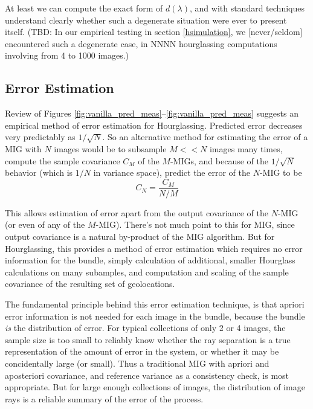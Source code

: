 \documentclass[11pt]{amsart}
\begin{document}
At least we can compute the exact form of $d(\lambda)$, and with
standard techniques understand clearly whether such a degenerate
situation were ever to present itself. (TBD: In our empirical testing
in section \ref{hsimulation}, we [never/seldom] encountered such a
degenerate case, in NNNN hourglassing computations involving from 4 to
1000 images.)


\subsection{Error Estimation}
Review of Figures \ref{fig:vanilla_pred_meas}--\ref{fig:vanilla_pred_meas}
suggests an empirical meth\-od of error estimation for Hourglassing. Predicted
error decreases very predictably as $1/\sqrt N$. So an alternative method for
estimating the error of a MIG with $N$ images would be to subsample $M<<N$
images many times, compute the sample covariance $C_M$ of the $M$-MIGs, and
because of the $1/\sqrt N$ behavior (which is $1/N$ in variance space), predict
the error of the $N$-MIG to be $$C_N=\frac{C_M}{N/M}$$

This allows estimation of error apart from the output covariance of the $N$-MIG
(or even of any of the $M$-MIG). There's not much point to this for MIG, since
output covariance is a natural by-product of the MIG algorithm. But for
Hourglassing, this provides a method of error estimation which requires no error
information for the bundle, simply calculation of additional, smaller Hourglass
calculations on many subamples, and computation and scaling of the sample
covariance of the resulting set of geolocations.

The fundamental principle behind this error estimation technique, is that
apriori error information is not needed for each image in the bundle, because
the bundle {\em is} the distribution of error. For typical collections of only 2
or 4 images, the sample size is too small to reliably know whether the ray
separation is a true representation of the amount of error in the system, or
whether it may be concidentally large (or small). Thus a traditional MIG with
apriori and aposteriori covariance, and reference variance as a consistency
check, is most appropriate. But for large enough collections of images, the
distribution of image rays is a reliable summary of the error of the process.
\end{document}
